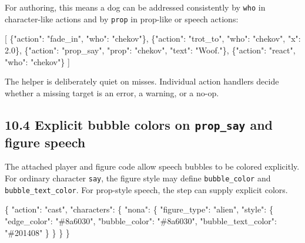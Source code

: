 \documentclass[
  11pt,
]{book}
\newenvironment{Shaded}{}{}
\newcommand{\DataTypeTok}[1]{\textcolor[rgb]{0.56,0.13,0.00}{#1}}
\newcommand{\FloatTok}[1]{\textcolor[rgb]{0.25,0.63,0.44}{#1}}
\newcommand{\FunctionTok}[1]{\textcolor[rgb]{0.02,0.16,0.49}{#1}}
\newcommand{\OtherTok}[1]{\textcolor[rgb]{0.00,0.44,0.13}{#1}}
\newcommand{\StringTok}[1]{\textcolor[rgb]{0.25,0.44,0.63}{#1}}
\begin{document}
For authoring, this means a dog can be addressed consistently by
\texttt{who} in character-like actions and by \texttt{prop} in prop-like
or speech actions:

\begin{Shaded}
\begin{Highlighting}[]
\OtherTok{[}
  \FunctionTok{\{}\DataTypeTok{"action"}\FunctionTok{:} \StringTok{"fade\_in"}\FunctionTok{,}  \DataTypeTok{"who"}\FunctionTok{:} \StringTok{"chekov"}\FunctionTok{\}}\OtherTok{,}
  \FunctionTok{\{}\DataTypeTok{"action"}\FunctionTok{:} \StringTok{"trot\_to"}\FunctionTok{,}  \DataTypeTok{"who"}\FunctionTok{:} \StringTok{"chekov"}\FunctionTok{,} \DataTypeTok{"x"}\FunctionTok{:} \FloatTok{2.0}\FunctionTok{\}}\OtherTok{,}
  \FunctionTok{\{}\DataTypeTok{"action"}\FunctionTok{:} \StringTok{"prop\_say"}\FunctionTok{,} \DataTypeTok{"prop"}\FunctionTok{:} \StringTok{"chekov"}\FunctionTok{,} \DataTypeTok{"text"}\FunctionTok{:} \StringTok{"Woof."}\FunctionTok{\}}\OtherTok{,}
  \FunctionTok{\{}\DataTypeTok{"action"}\FunctionTok{:} \StringTok{"react"}\FunctionTok{,}    \DataTypeTok{"who"}\FunctionTok{:} \StringTok{"chekov"}\FunctionTok{\}}
\OtherTok{]}
\end{Highlighting}
\end{Shaded}

The helper is deliberately quiet on misses. Individual action handlers
decide whether a missing target is an error, a warning, or a no-op.

\subsection{\texorpdfstring{10.4 Explicit bubble colors on
\texttt{prop\_say} and figure
speech}{10.4 Explicit bubble colors on prop\_say and figure speech}}\label{explicit-bubble-colors-on-prop_say-and-figure-speech}

The attached player and figure code allow speech bubbles to be colored
explicitly. For ordinary character \texttt{say}, the figure style may
define \texttt{bubble\_color} and \texttt{bubble\_text\_color}. For
prop-style speech, the step can supply explicit colors.

\begin{Shaded}
\begin{Highlighting}[]
\FunctionTok{\{}
  \DataTypeTok{"action"}\FunctionTok{:} \StringTok{"cast"}\FunctionTok{,}
  \DataTypeTok{"characters"}\FunctionTok{:} \FunctionTok{\{}
    \DataTypeTok{"nona"}\FunctionTok{:} \FunctionTok{\{}
      \DataTypeTok{"figure\_type"}\FunctionTok{:} \StringTok{"alien"}\FunctionTok{,}
      \DataTypeTok{"style"}\FunctionTok{:} \FunctionTok{\{}
        \DataTypeTok{"edge\_color"}\FunctionTok{:} \StringTok{"\#8a6030"}\FunctionTok{,}
        \DataTypeTok{"bubble\_color"}\FunctionTok{:} \StringTok{"\#8a6030"}\FunctionTok{,}
        \DataTypeTok{"bubble\_text\_color"}\FunctionTok{:} \StringTok{"\#201408"}
      \FunctionTok{\}}
    \FunctionTok{\}}
  \FunctionTok{\}}
\FunctionTok{\}}
\end{Highlighting}
\end{Shaded}
\end{document}
